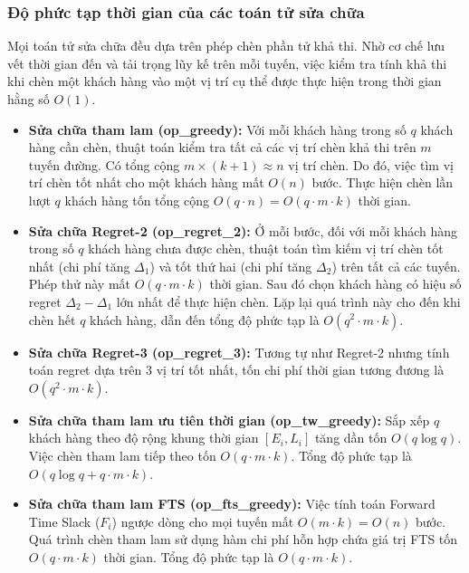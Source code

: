 \documentclass[13pt,a4paper]{extarticle}
\begin{document}
\subsubsection{Độ phức tạp thời gian của các toán tử sửa chữa}
Mọi toán tử sửa chữa đều dựa trên phép chèn phần tử khả thi. Nhờ cơ chế lưu vết thời gian đến và tải trọng lũy kế trên mỗi tuyến, việc kiểm tra tính khả thi khi chèn một khách hàng vào một vị trí cụ thể được thực hiện trong thời gian hằng số $O(1)$.
\begin{itemize}[leftmargin=1.2cm]
  \item \textbf{Sửa chữa tham lam (op\_greedy):} Với mỗi khách hàng trong số $q$ khách hàng cần chèn, thuật toán kiểm tra tất cả các vị trí chèn khả thi trên $m$ tuyến đường. Có tổng cộng $m \times (k+1) \approx n$ vị trí chèn. Do đó, việc tìm vị trí chèn tốt nhất cho một khách hàng mất $O(n)$ bước. Thực hiện chèn lần lượt $q$ khách hàng tốn tổng cộng $O(q \cdot n) = O(q \cdot m \cdot k)$ thời gian.
  \item \textbf{Sửa chữa Regret-2 (op\_regret\_2):} Ở mỗi bước, đối với mỗi khách hàng trong số $q$ khách hàng chưa được chèn, thuật toán tìm kiếm vị trí chèn tốt nhất (chi phí tăng $\Delta_1$) và tốt thứ hai (chi phí tăng $\Delta_2$) trên tất cả các tuyến. Phép thử này mất $O(q \cdot m \cdot k)$ thời gian. Sau đó chọn khách hàng có hiệu số regret $\Delta_2 - \Delta_1$ lớn nhất để thực hiện chèn. Lặp lại quá trình này cho đến khi chèn hết $q$ khách hàng, dẫn đến tổng độ phức tạp là $O(q^2 \cdot m \cdot k)$.
  \item \textbf{Sửa chữa Regret-3 (op\_regret\_3):} Tương tự như Regret-2 nhưng tính toán regret dựa trên 3 vị trí tốt nhất, tốn chi phí thời gian tương đương là $O(q^2 \cdot m \cdot k)$.
  \item \textbf{Sửa chữa tham lam ưu tiên thời gian (op\_tw\_greedy):} Sắp xếp $q$ khách hàng theo độ rộng khung thời gian $[E_i, L_i]$ tăng dần tốn $O(q \log q)$. Việc chèn tham lam tiếp theo tốn $O(q \cdot m \cdot k)$. Tổng độ phức tạp là $O(q \log q + q \cdot m \cdot k)$.
  \item \textbf{Sửa chữa tham lam FTS (op\_fts\_greedy):} Việc tính toán Forward Time Slack ($F_i$) ngược dòng cho mọi tuyến mất $O(m \cdot k) = O(n)$ bước. Quá trình chèn tham lam sử dụng hàm chi phí hỗn hợp chứa giá trị FTS tốn $O(q \cdot m \cdot k)$ thời gian. Tổng độ phức tạp là $O(q \cdot m \cdot k)$.
\end{itemize}
\end{document}
